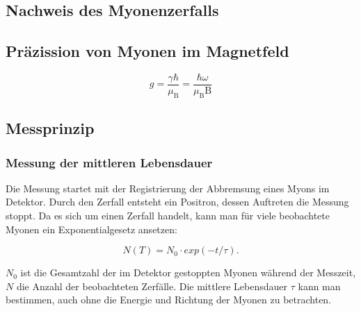 \documentclass[a4paper,ngerman]{scrartcl}
\begin{document}



\subsection{Nachweis des Myonenzerfalls}
\label{sec:nachweis}


\subsection{Präzission von Myonen im Magnetfeld}
\label{sec:prazission}
\begin{equation}
g = \frac{\gamma \hbar}{\mu_\mathrm{B}} = \frac{\hbar \omega}{\mu_\mathrm{B}\mathrm{B}}
\end{equation}

\subsection{Messprinzip}
\label{sec:messprinzip}

\subsubsection*{Messung der mittleren Lebensdauer}

Die Messung startet mit der Registrierung der Abbremsung eines Myons im Detektor. Durch den Zerfall entsteht ein Positron, dessen Auftreten die Messung stoppt. Da es sich um einen Zerfall handelt, kann man für viele beobachtete Myonen ein Exponentialgesetz ansetzen:

\begin{equation}
\label{eqn:messprinzip-zerfall}
N(T) = N_0 \cdot exp(-t / \tau) .
\end{equation} 
	
$N_0$ ist die Gesamtzahl der im Detektor gestoppten Myonen während der Messzeit, $N$ die Anzahl der beobachteten Zerfälle.
Die mittlere Lebensdauer $\tau$ kann man bestimmen, auch ohne die Energie und Richtung der Myonen zu betrachten. 
\end{document}
